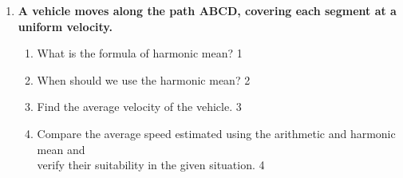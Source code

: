 \documentclass[a4paper,oneside]{book}
\begin{document}
\begin{enumerate}

 \item
  \textbf{A vehicle moves along the path ABCD, covering each segment at a uniform velocity.}

\begin{center}

  \end{center}
  \begin{enumerate}
    \item
	What is the formula of harmonic mean? \hfill 1
    \item
	When should we use the harmonic mean? \hfill 2
    \item  
	Find the average velocity of the vehicle. \hfill 3
    \item
	Compare the average speed estimated using the arithmetic and harmonic mean and \\ verify their suitability in the given situation. \hfill 4
  \end{enumerate}



\end{enumerate}
\end{document}
